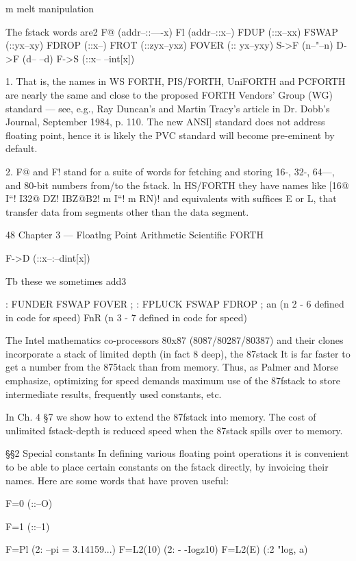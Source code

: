 m melt manipulation

The fstack words are2
F@ (addr--::—-x)
Fl (addr--::x--)
FDUP (::x--xx)
FSWAP (::yx--xy)
FDROP (::x--)
FROT (::zyx--yxz)
FOVER (:: yx--yxy)
S->F (n--"--n)
D->F (d-- --d)
F->S (::x-- --int[x])

 

1. That is, the names in WS FORTH, PIS/FORTH, UniFORTH and PCFORTH are nearly the
same and close to the proposed FORTH Vendors' Group (WG) standard — see, e.g., Ray
Duncan's and Martin Tracy's article in Dr. Dobb's Journal, September 1984, p. 110. The new
ANSI] standard does not address ﬂoating point, hence it is likely the PVC standard will become
pre-eminent by default.

2. F@ and F! stand for a suite of words for fetching and storing 16-, 32-, 64—, and 80-bit numbers
from/to the fstack. ln HS/FORTH they have names like [16@ I“! I32@ DZ! IBZ@B2!
m I“! m RN)! and equivalents with sufﬁces E or L, that transfer data from segments
other than the data segment.

48 Chapter 3 — Floatlng Point Arithmetic Scientiﬁc FORTH

F->D (::x--:--dint[x])

Tb these we sometimes add3

: FUNDER FSWAP FOVER ;
: FPLUCK FSWAP FDROP ;
an (n 2 - 6 deﬁned in code for speed)
FnR (n 3 - 7 deﬁned in code for speed)

The Intel mathematics co-processors 80x87 (8087/80287/80387)
and their clones incorporate a stack of limited depth (in fact 8
deep), the 87stack It is far faster to get a number from the 875tack
than from memory. Thus, as Palmer and Morse emphasize,
optimizing for speed demands maximum use of the 87fstack to
store intermediate results, frequently used constants, etc.

In Ch. 4 §7 we show how to extend the 87fstack into memory. The
cost of unlimited fstack-depth is reduced speed when the 87stack
spills over to memory.

§§2 Special constants
In deﬁning various ﬂoating point operations it is convenient to be
able to place certain constants on the fstack directly, by invoicing
their names. Here are some words that have proven useful:

F=0 (::--O)

F=1 (::--1)

F=Pl (2: --pi = 3.14159...)
F=L2(10) (2: - -Iogz10)
F=L2(E) (:2 "log, a)

